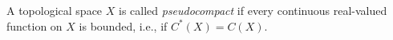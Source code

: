 A topological space $X$ is called \textit{pseudocompact} if every continuous real-valued function on $X$ is bounded, i.e., if $C^*(X) = C(X)$.
